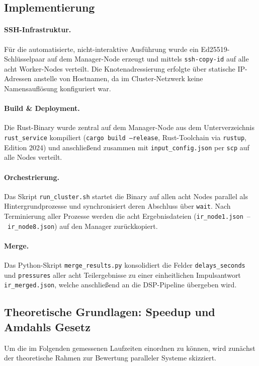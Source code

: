 \documentclass{article}
\begin{document}
\subsection{Implementierung}

\paragraph{SSH-Infrastruktur.}
Für die automatisierte, nicht-interaktive Ausführung wurde ein
Ed25519-Schlüsselpaar auf dem Manager-Node erzeugt und mittels
\texttt{ssh-copy-id} auf alle acht Worker-Nodes verteilt. Die
Knotenadressierung erfolgte über statische IP-Adressen anstelle von
Hostnamen, da im Cluster-Netzwerk keine Namensauflösung konfiguriert war.

\paragraph{Build \& Deployment.}
Die Rust-Binary wurde zentral auf dem Manager-Node aus dem Unterverzeichnis
\texttt{rust\_service} kompiliert (\texttt{cargo build --release},
Rust-Toolchain via \texttt{rustup}, Edition 2024) und anschließend
zusammen mit \texttt{input\_config.json} per \texttt{scp} auf alle Nodes
verteilt.

\paragraph{Orchestrierung.}
Das Skript \texttt{run\_cluster.sh} startet die Binary auf allen acht
Nodes parallel als Hintergrundprozesse und synchronisiert deren Abschluss
über \texttt{wait}. Nach Terminierung aller Prozesse werden die acht
Ergebnisdateien (\texttt{ir\_node1.json}~--~\texttt{ir\_node8.json}) auf
den Manager zurückkopiert.

\paragraph{Merge.}
Das Python-Skript \texttt{merge\_results.py} konsolidiert die Felder
\texttt{delays\_seconds} und \texttt{pressures} aller acht Teilergebnisse
zu einer einheitlichen Impulsantwort \texttt{ir\_merged.json}, welche
anschließend an die DSP-Pipeline übergeben wird.

\subsection{Theoretische Grundlagen: Speedup und Amdahls Gesetz}
\label{sec:amdahl}
Um die im Folgenden gemessenen Laufzeiten einordnen zu
können, wird zunächst der theoretische Rahmen zur Bewertung paralleler
Systeme skizziert.
\end{document}
